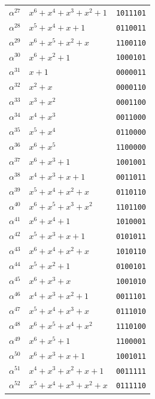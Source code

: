 \documentclass[10pt,a4paper]{article}
\begin{document}
\begin{longtable}{@{}c l c@{}}
    $\alpha^{27}$ & $x^{6}+x^{4}+x^{3}+x^{2}+1$ & \texttt{1011101} \\
    $\alpha^{28}$ & $x^{5}+x^{4}+x+1$ & \texttt{0110011} \\
    $\alpha^{29}$ & $x^{6}+x^{5}+x^{2}+x$ & \texttt{1100110} \\
    $\alpha^{30}$ & $x^{6}+x^{2}+1$ & \texttt{1000101} \\
    $\alpha^{31}$ & $x+1$ & \texttt{0000011} \\
    $\alpha^{32}$ & $x^{2}+x$ & \texttt{0000110} \\
    $\alpha^{33}$ & $x^{3}+x^{2}$ & \texttt{0001100} \\
    $\alpha^{34}$ & $x^{4}+x^{3}$ & \texttt{0011000} \\
    $\alpha^{35}$ & $x^{5}+x^{4}$ & \texttt{0110000} \\
    $\alpha^{36}$ & $x^{6}+x^{5}$ & \texttt{1100000} \\
    $\alpha^{37}$ & $x^{6}+x^{3}+1$ & \texttt{1001001} \\
    $\alpha^{38}$ & $x^{4}+x^{3}+x+1$ & \texttt{0011011} \\
    $\alpha^{39}$ & $x^{5}+x^{4}+x^{2}+x$ & \texttt{0110110} \\
    $\alpha^{40}$ & $x^{6}+x^{5}+x^{3}+x^{2}$ & \texttt{1101100} \\
    $\alpha^{41}$ & $x^{6}+x^{4}+1$ & \texttt{1010001} \\
    $\alpha^{42}$ & $x^{5}+x^{3}+x+1$ & \texttt{0101011} \\
    $\alpha^{43}$ & $x^{6}+x^{4}+x^{2}+x$ & \texttt{1010110} \\
    $\alpha^{44}$ & $x^{5}+x^{2}+1$ & \texttt{0100101} \\
    $\alpha^{45}$ & $x^{6}+x^{3}+x$ & \texttt{1001010} \\
    $\alpha^{46}$ & $x^{4}+x^{3}+x^{2}+1$ & \texttt{0011101} \\
    $\alpha^{47}$ & $x^{5}+x^{4}+x^{3}+x$ & \texttt{0111010} \\
    $\alpha^{48}$ & $x^{6}+x^{5}+x^{4}+x^{2}$ & \texttt{1110100} \\
    $\alpha^{49}$ & $x^{6}+x^{5}+1$ & \texttt{1100001} \\
    $\alpha^{50}$ & $x^{6}+x^{3}+x+1$ & \texttt{1001011} \\
    $\alpha^{51}$ & $x^{4}+x^{3}+x^{2}+x+1$ & \texttt{0011111} \\
    $\alpha^{52}$ & $x^{5}+x^{4}+x^{3}+x^{2}+x$ & \texttt{0111110} \\

\end{longtable}
\end{document}
